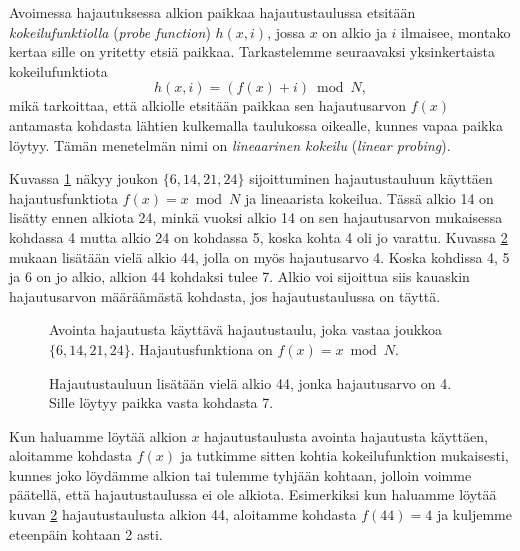 
Avoimessa hajautuksessa alkion paikkaa hajautustaulussa etsitään
\emph{kokeilufunktiolla} (\emph{probe function})
$h(x,i)$, jossa $x$ on alkio ja $i$ ilmaisee, montako kertaa
sille on yritetty etsiä paikkaa.
Tarkastelemme seuraavaksi yksinkertaista kokeilufunktiota
\[ h(x,i) = (f(x)+i) \bmod N,\]
mikä tarkoittaa, että alkiolle etsitään paikkaa sen
hajautusarvon $f(x)$ antamasta kohdasta lähtien kulkemalla taulukossa oikealle,
kunnes vapaa paikka löytyy.
Tämän menetelmän nimi on \emph{lineaarinen kokeilu}
(\emph{linear probing}).

Kuvassa \ref{fig:hajavo} näkyy joukon $\{6,14,21,24\}$
sijoittuminen hajautustauluun
käyttäen hajautusfunktiota $f(x)=x \bmod N$ ja lineaarista kokeilua.
Tässä alkio 14 on lisätty ennen alkiota 24,
minkä vuoksi alkio 14 on sen hajautusarvon mukaisessa kohdassa 4
mutta alkio 24 on kohdassa 5, koska kohta 4 oli jo varattu.
Kuvassa \ref{fig:hajav2} mukaan lisätään vielä alkio 44,
jolla on myös hajautusarvo 4.
Koska kohdissa 4, 5 ja 6 on jo alkio, alkion 44 kohdaksi tulee 7.
Alkio voi sijoittua siis kauaskin hajautusarvon määräämästä kohdasta,
jos hajautustaulussa on täyttä.

\begin{figure}
\center
{}
\caption{Avointa hajautusta käyttävä hajautustaulu, joka vastaa joukkoa $\{6,14,21,24\}$.
Hajautusfunktiona on $f(x)=x \bmod N$.}
\label{fig:hajavo}
\end{figure}

\begin{figure}
\center
{}
\caption{Hajautustauluun lisätään vielä alkio 44, jonka hajautusarvo on 4.
Sille löytyy paikka vasta kohdasta 7.}
\label{fig:hajav2}
\end{figure}

Kun haluamme löytää alkion $x$ hajautustaulusta avointa hajautusta käyt\-täen,
aloitamme kohdasta $f(x)$ ja tutkimme sitten kohtia kokeilufunktion mukaisesti,
kunnes joko löydämme alkion tai tulemme tyhjään kohtaan, jolloin voimme päätellä,
että hajautustaulussa ei ole alkiota.
Esimerkiksi kun haluamme löytää kuvan \ref{fig:hajav2} hajautustaulusta
alkion 44, aloitamme kohdasta $f(44)=4$ ja kuljemme eteenpäin kohtaan 2 asti.

